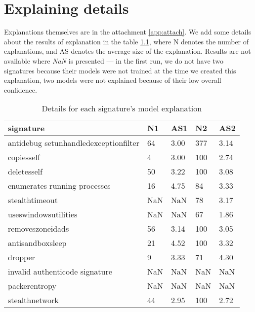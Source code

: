 \chapter{Explaining details} \label{app:expl}
Explanations themselves are in the attachment \ref{app:attach}. We add some details about the results of explanation in the table \ref{tab:expdet}, where N denotes the number of explanations, and AS denotes the average size of the explanation. Results are not available where \emph{NaN} is presented --- in the first run, we do not have two signatures because their models were not trained at the time we created this explanation, two models were not explained because of their low overall confidence.

\begin{table}[h]
    \centering
    \caption{Details for each signature's model explanation}
    \begin{tabular}{lllll}
      \toprule
      \textbf{signature} &
      \textbf{N1} &
      \textbf{AS1} &
      \textbf{N2} &
      \textbf{AS2}
      \\
      \midrule
      antidebug setunhandledexceptionfilter & 64 & 3.00 & 377 & 3.14  \\
      \midrule
      copiesself & 4 & 3.00 & 100 & 2.74 \\
      \midrule
      deletesself & 50 & 3.22 & 100 & 3.08 \\
      \midrule
      enumerates running processes & 16 & 4.75 & 84 & 3.33 \\
      \midrule
      stealthtimeout & NaN & NaN & 78 &  3.17 \\
      \midrule
      useswindowsutilities & NaN & NaN & 67 &  1.86 \\
      \midrule
      removeszoneidads & 56 & 3.14 & 100 & 3.05 \\
      \midrule
      antisandboxsleep & 21 & 4.52 & 100 & 3.32 \\
      \midrule
      dropper & 9 & 3.33 & 71 & 4.30 \\
      \midrule
      invalid authenticode signature &  NaN &  NaN &  NaN &  NaN \\
      \midrule
      packerentropy & NaN &  NaN &  NaN &  NaN \\
      \midrule
      stealthnetwork & 44 & 2.95 & 100 & 2.72 \\
      \bottomrule
    \end{tabular}
    \label{tab:expdet}
  \end{table}